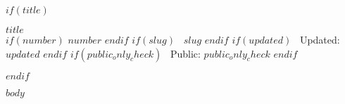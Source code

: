 $if(title)$
\begin{center}
  {\LARGE\bfseries $title$}\\[6pt]
  {\small
    $if(number)$ $number$ $endif$
    $if(slug)$ \textbullet\ $slug$ $endif$
    $if(updated)$ \textbullet\ Updated: $updated$ $endif$
    $if(public_only_check)$ \textbullet\ Public: $public_only_check$ $endif$
  }
\end{center}
\medskip
$endif$

$body$

\clearpage
